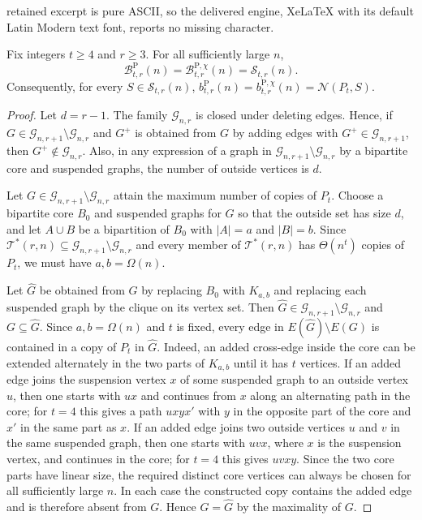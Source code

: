 \documentclass[10pt,a4paper]{amsart}
\newcommand{\N}{\mathcal N}
\newcommand{\cB}{\mathcal B}
\newcommand{\cG}{\mathcal G}
\newcommand{\cS}{\mathcal S}
\newcommand{\cT}{\mathcal T}
\begin{document}
retained excerpt is pure ASCII, so the delivered engine, XeLaTeX with its default Latin Modern text font, reports no missing character.
\begin{proposition}\label{prop:path-extremal}
Fix integers $t\ge4$ and $r\ge3$. For all sufficiently large $n$,
\[
        \cB^{\mathrm P}_{t,r}(n)=\cB^{\mathrm P,\chi}_{t,r}(n)=\cS_{t,r}(n).
\]
Consequently, for every $S\in\cS_{t,r}(n)$, $b^{\mathrm P}_{t,r}(n)=b^{\mathrm P,\chi}_{t,r}(n)=\N(P_t,S)$.
\end{proposition}

\begin{proof}
Let $d=r-1$. The family $\cG_{n,r}$ is closed under deleting edges. Hence, if $G\in\cG_{n,r+1}\setminus\cG_{n,r}$ and $G^+$ is obtained from $G$ by adding edges with $G^+\in\cG_{n,r+1}$, then $G^+\notin\cG_{n,r}$. Also, in any expression of a graph in $\cG_{n,r+1}\setminus\cG_{n,r}$ by a bipartite core and suspended graphs, the number of outside vertices is $d$.

Let $G\in\cG_{n,r+1}\setminus\cG_{n,r}$ attain the maximum number of copies of $P_t$. Choose a bipartite core $B_0$ and suspended graphs for $G$ so that the outside set has size $d$, and let $A\cup B$ be a bipartition of $B_0$ with $|A|=a$ and $|B|=b$. Since $\cT^*(r,n)\subseteq\cG_{n,r+1}\setminus\cG_{n,r}$ and every member of $\cT^*(r,n)$ has $\Theta(n^t)$ copies of $P_t$, we must have $a,b=\Omega(n)$.

Let $\widehat G$ be obtained from $G$ by replacing $B_0$ with $K_{a,b}$ and replacing each suspended graph by the clique on its vertex set. Then $\widehat G\in\cG_{n,r+1}\setminus\cG_{n,r}$ and $G\subseteq\widehat G$. Since $a,b=\Omega(n)$ and $t$ is fixed, every edge in $E(\widehat G)\setminus E(G)$ is contained in a copy of $P_t$ in $\widehat G$. Indeed, an added cross-edge inside the core can be extended alternately in the two parts of $K_{a,b}$ until it has $t$ vertices. If an added edge joins the suspension vertex $x$ of some suspended graph to an outside vertex $u$, then one starts with $u x$ and continues from $x$ along an alternating path in the core; for $t=4$ this gives a path $u x y x'$ with $y$ in the opposite part of the core and $x'$ in the same part as $x$. If an added edge joins two outside vertices $u$ and $v$ in the same suspended graph, then one starts with $u v x$, where $x$ is the suspension vertex, and continues in the core; for $t=4$ this gives $u v x y$. Since the two core parts have linear size, the required distinct core vertices can always be chosen for all sufficiently large $n$. In each case the constructed copy contains the added edge and is therefore absent from $G$. Hence $G=\widehat G$ by the maximality of $G$.


\end{proof}
\end{document}
